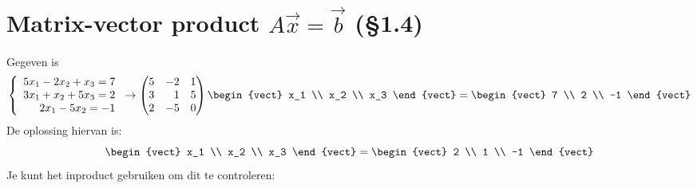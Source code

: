 \section{Matrix-vector product $A \vec{x} = \vec{b}$ (\S 1.4)}
Gegeven is 
\[ \left\{ \begin{array}{r}
	5x_1 - 2x_2 + x_3 = 7 \\
	3x_1 + x_2 + 5x_3 = 2 \\
	2x_1 - 5x_2 = -1 \\
\end{array} \right. \to \begin{pmatrix*}[r]
	5 & -2 & 1 \\
	3 & 1 & 5 \\
	2 & -5 & 0
\end{pmatrix*} \begin{vect} x_1 \\ x_2 \\ x_3 \end{vect} = \begin{vect} 7 \\ 2 \\ -1 \end{vect} \]
De oplossing hiervan is:
\[ \begin{vect} x_1 \\ x_2 \\ x_3 \end{vect} = \begin{vect} 2 \\ 1 \\ -1 \end{vect} \]
Je kunt het inproduct gebruiken om dit te controleren:
